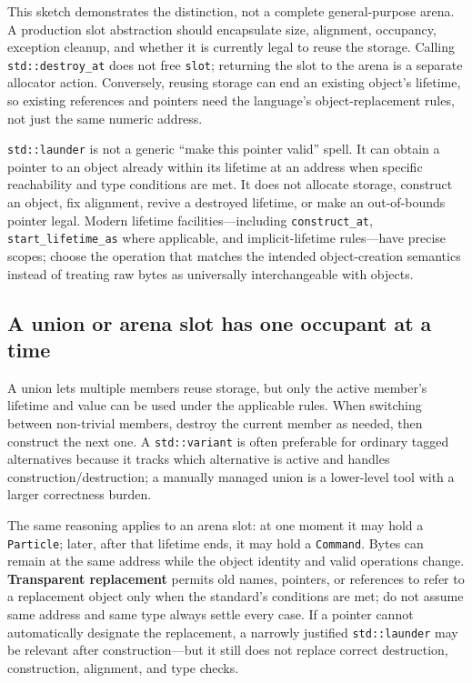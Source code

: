This sketch demonstrates the distinction, not a complete general-purpose arena. A production slot abstraction should encapsulate size, alignment, occupancy, exception cleanup, and whether it is currently legal to reuse the storage. Calling \texttt{std::destroy\_at} does not free \texttt{slot}; returning the slot to the arena is a separate allocator action. Conversely, reusing storage can end an existing object's lifetime, so existing references and pointers need the language's object-replacement rules, not just the same numeric address.

\texttt{std::launder} is not a generic ``make this pointer valid'' spell. It can obtain a pointer to an object already within its lifetime at an address when specific reachability and type conditions are met. It does not allocate storage, construct an object, fix alignment, revive a destroyed lifetime, or make an out-of-bounds pointer legal. Modern lifetime facilities---including \texttt{construct\_at}, \texttt{start\_lifetime\_as} where applicable, and implicit-lifetime rules---have precise scopes; choose the operation that matches the intended object-creation semantics instead of treating raw bytes as universally interchangeable with objects.

\subsection{A union or arena slot has one occupant at a time}\label{01-foundations-i-ch004-a-union-or-arena-slot-has-one-occupant-at-a-time}

A union lets multiple members reuse storage, but only the active member's lifetime and value can be used under the applicable rules. When switching between non-trivial members, destroy the current member as needed, then construct the next one. A \texttt{std::variant} is often preferable for ordinary tagged alternatives because it tracks which alternative is active and handles construction/destruction; a manually managed union is a lower-level tool with a larger correctness burden.

The same reasoning applies to an arena slot: at one moment it may hold a \texttt{Particle}; later, after that lifetime ends, it may hold a \texttt{Command}. Bytes can remain at the same address while the object identity and valid operations change. \textbf{Transparent replacement} permits old names, pointers, or references to refer to a replacement object only when the standard's conditions are met; do not assume same address and same type always settle every case. If a pointer cannot automatically designate the replacement, a narrowly justified \texttt{std::launder} may be relevant after construction---but it still does not replace correct destruction, construction, alignment, and type checks.

